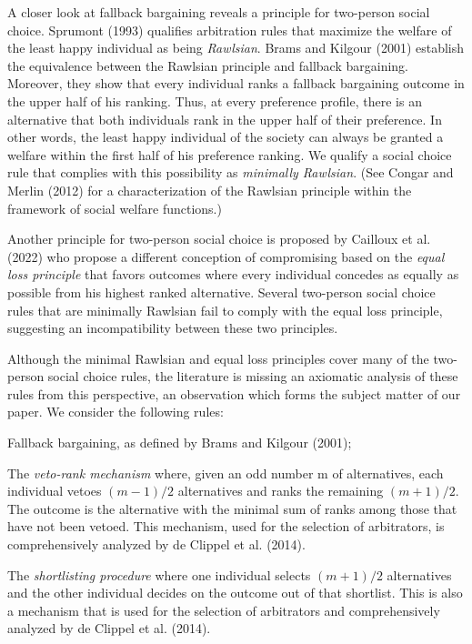 \documentclass[version=3.21, pagesize, twoside=off, bibliography=totoc, DIV=calc, fontsize=12pt, a4paper]{scrartcl}
\begin{document}
A closer look at fallback bargaining reveals a principle for two-person social choice. Sprumont (1993) qualifies arbitration rules that maximize the welfare of the least happy individual as being \textit{Rawlsian}. Brams and Kilgour (2001) establish the equivalence between the Rawlsian principle and fallback bargaining. Moreover, they show that every individual ranks a fallback bargaining outcome in the upper half of his ranking. Thus, at every preference profile, there is an alternative that both individuals rank in the upper half of their preference. In other words, the least happy individual of the society can always be granted a welfare within the first half of his preference ranking. We qualify a social choice rule that complies with this possibility as \textit{minimally Rawlsian}. (See Congar and Merlin (2012) for a characterization of the Rawlsian principle within the framework of social welfare functions.) 

Another principle for two-person social choice is proposed by Cailloux et al. (2022) who propose a different conception of compromising based on the \textit{equal loss principle} that favors outcomes where every individual concedes as equally as possible from his highest ranked alternative. Several two-person social choice rules that are minimally Rawlsian fail to comply with the equal loss principle, suggesting an incompatibility between these two principles.
 
Although the minimal Rawlsian and equal loss principles cover many of the two-person social choice rules, the literature is missing an axiomatic analysis of these rules from this perspective, an observation which forms the subject matter of our paper. We consider the following rules:

Fallback bargaining, as defined by Brams and Kilgour (2001);

The \textit{veto-rank mechanism} where, given an odd number m of alternatives, each individual vetoes $(m−1) / 2$ alternatives and ranks the remaining $(m+1) / 2$. The outcome is the alternative with the minimal sum of ranks among those that have not been vetoed. This mechanism, used for the selection of arbitrators, is comprehensively analyzed by de Clippel et al. (2014).


The \textit{shortlisting procedure} where one individual selects $(m+1) / 2$ alternatives and the other individual decides on the outcome out of that shortlist. This is also a mechanism that is used for the selection of arbitrators and comprehensively analyzed by de Clippel et al. (2014).
\end{document}

